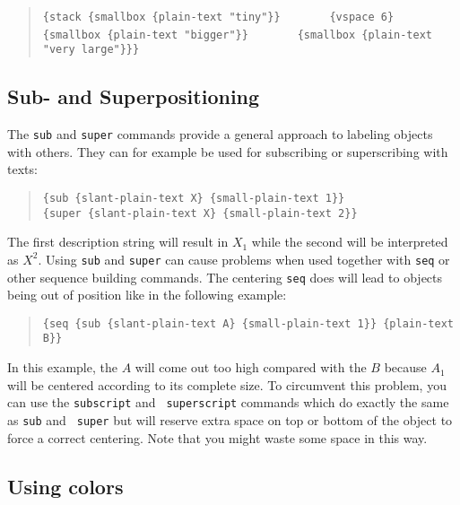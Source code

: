 \begin{quote}
\verb'{stack {smallbox {plain-text "tiny"}}' \newline
\verb'       {vspace 6}' \newline
\verb'       {smallbox {plain-text "bigger"}}' \newline
\verb'       {smallbox {plain-text "very large"}}}'
\end{quote}   

\subsection{Sub- and Superpositioning}

The {\tt sub} and {\tt super} commands provide a general approach to
labeling objects with others. They can for example be used for
subscribing or superscribing with texts:

\begin{quote}
\begin{verbatim}
{sub {slant-plain-text X} {small-plain-text 1}}
{super {slant-plain-text X} {small-plain-text 2}}
\end{verbatim}
\end{quote}

The first description string will result in $X_1$ while the second will
be interpreted as $X^2$. Using {\tt sub} and {\tt super} can cause
problems when used together with {\tt seq} or other sequence building
commands. The centering {\tt seq} does will lead to objects being out
of position like in the following example:

\begin{quote}
\begin{verbatim}
{seq {sub {slant-plain-text A} {small-plain-text 1}} {plain-text B}}
\end{verbatim}
\end{quote}

In this example, the $A$ will come out too high compared with the $B$
because $A_1$ will be centered according to its complete size. To
circumvent this problem, you can use the {\tt subscript} and {\tt
superscript} commands which do exactly the same as {\tt sub} and {\tt
super} but will reserve extra space on top or bottom of the object to
force a correct centering. Note that you might waste some space in this
way.


\subsection{Using colors}

